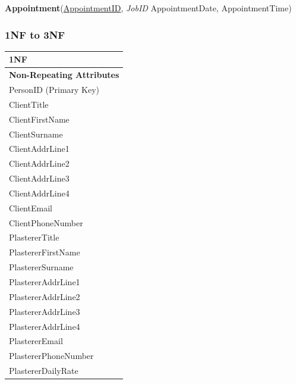 \begin{flushleft}
\textbf{Appointment}(\underline{AppointmentID}, \emph{JobID} AppointmentDate, AppointmentTime)
\end{flushleft}

\subsubsection{1NF to 3NF}
\begin{flushleft}
    \begin{longtable}{|p{12cm}|}
        \hline
			 \textbf{1NF} \\ \hline
         \textbf{Non-Repeating Attributes} \\ \hline
			PersonID (Primary Key) \\ 
         ClientTitle \\
			ClientFirstName \\
			ClientSurname \\
			ClientAddrLine1 \\
			ClientAddrLine2 \\
			ClientAddrLine3 \\
			ClientAddrLine4 \\
			ClientEmail \\
			ClientPhoneNumber \\
			PlastererTitle \\
			PlastererFirstName \\
			PlastererSurname \\
			PlastererAddrLine1 \\
			PlastererAddrLine2 \\
			PlastererAddrLine3 \\
			PlastererAddrLine4 \\
			PlastererEmail \\
			PlastererPhoneNumber \\
			PlastererDailyRate \\ \hline


\end{longtable}
\end{flushleft}
